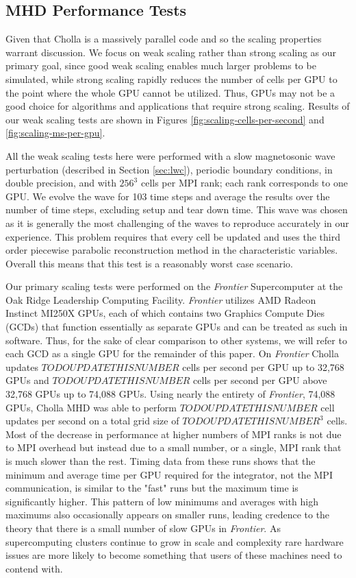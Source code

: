 \subsection{MHD Performance Tests}
\label{sec:mhd-perf-tests}

Given that Cholla is a massively parallel code and so the scaling properties warrant discussion. We focus on weak scaling rather than strong scaling as our primary goal, since good weak scaling enables much larger problems to be simulated, while strong scaling rapidly reduces the number of cells per GPU to the point where the whole GPU cannot be utilized. Thus, GPUs may not be a good choice for algorithms and applications that require strong scaling. Results of our weak scaling tests are shown in Figures \ref{fig:scaling-cells-per-second} and \ref{fig:scaling-ms-per-gpu}. 

All the weak scaling tests here were performed with a slow magnetosonic wave perturbation (described in Section \ref{sec:lwc}), periodic boundary conditions, in double precision, and with $256^3$ cells per MPI rank; each rank corresponds to one GPU. We evolve the wave for 103 time steps and average the results over the number of time steps, excluding setup and tear down time. This wave was chosen as it is generally the most challenging of the waves to reproduce accurately in our experience. This problem requires that every cell be updated and uses the third order piecewise parabolic reconstruction method in the characteristic variables. Overall this means that this test is a reasonably worst case scenario.

Our primary scaling tests were performed on the \textit{Frontier} Supercomputer at the Oak Ridge Leadership Computing Facility. \textit{Frontier} utilizes AMD Radeon Instinct MI250X GPUs, each of which contains two Graphics Compute Dies (GCDs) that function essentially as separate GPUs and can be treated as such in software. Thus, for the sake of clear comparison to other systems, we will refer to each GCD as a single GPU for the remainder of this paper. On \textit{Frontier} Cholla updates $TODO UPDATE THIS NUMBER$ cells per second per GPU up to 32,768 GPUs and $TODO UPDATE THIS NUMBER$ cells per second per GPU above 32,768 GPUs up to 74,088 GPUs. Using nearly the entirety of \textit{Frontier}, 74,088 GPUs, Cholla MHD was able to perform $TODO UPDATE THIS NUMBER$ cell updates per second on a total grid size of $TODO UPDATE THIS NUMBER^3$ cells. Most of the decrease in performance at higher numbers of MPI ranks is not due to MPI overhead but instead due to a small number, or a single, MPI rank that is much slower than the rest. Timing data from these runs shows that the minimum and average time per GPU required for the integrator, not the MPI communication, is similar to the "fast" runs but the maximum time is significantly higher. This pattern of low minimums and averages with high maximums also occasionally appears on smaller runs, leading credence to the theory that there is a small number of slow GPUs in \textit{Frontier}. As supercomputing clusters continue to grow in scale and complexity rare hardware issues are more likely to become something that users of these machines need to contend with.

